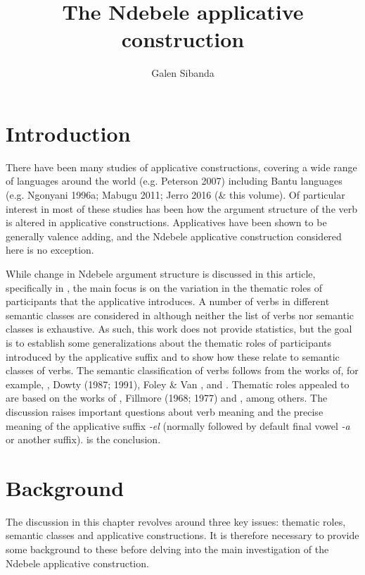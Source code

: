 \documentclass[output=paper]{langsci/langscibook}
\title{The Ndebele applicative construction}
\author{%
 Galen Sibanda \affiliation{Michigan State University} 
}
\begin{document}
\section {Introduction}

There have been many studies of applicative constructions, covering a wide range of languages around the world (e.g. Peterson 2007) including Bantu languages (e.g. Ngonyani 1996a; Mabugu 2011; Jerro 2016 (\& this volume). Of particular interest in most of these studies has been how the argument structure of the verb is altered in applicative constructions. Applicatives have been shown to be generally valence adding, and the Ndebele applicative construction considered here is no exception. 

 While change in Ndebele argument structure is discussed in this article, specifically in , the main focus is on the variation in the thematic roles of participants that the applicative introduces. A number of verbs in different semantic classes are considered in  although neither the list of verbs nor semantic classes is exhaustive. As such, this work does not provide statistics, but the goal is to establish some generalizations about the thematic roles of participants introduced by the applicative suffix and to show how these relate to semantic classes of verbs. The semantic classification of verbs follows from the works of, for example, \citet{Chafe1970}, Dowty (1987; 1991), Foley \& Van \citet{Valin1984}, and \citet{Payne1997}. Thematic roles appealed to are based on the works of \citet{Frawley1992}, Fillmore (1968; 1977) and \citet{Halliday1970}, among others. The discussion raises important questions about verb meaning and the precise meaning of the applicative suffix \textit{-el }(normally followed by default final vowel \textit{-a} or another suffix).  is the conclusion.

\section {Background}

The discussion in this chapter revolves around three key issues: thematic roles, semantic classes and applicative constructions. It is therefore necessary to provide some background to these before delving into the main investigation of the Ndebele applicative construction. 
\end{document}
